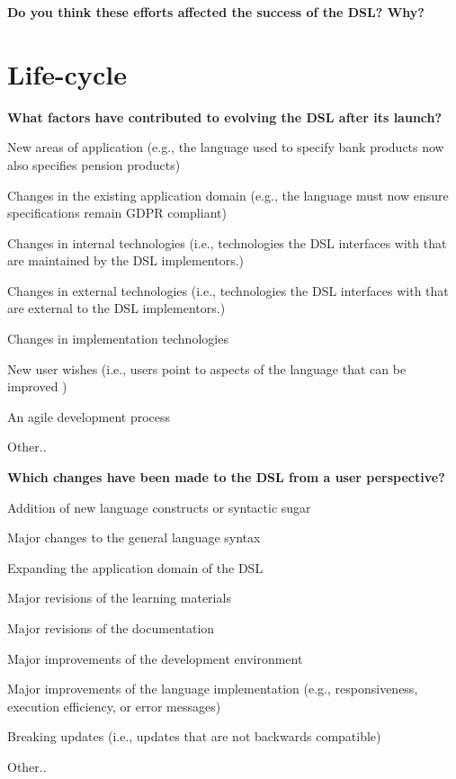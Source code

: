 \documentclass{article}
\begin{document}
\textbf{Do you think these efforts affected the success of the DSL? Why?}\\
\fbox{\begin{minipage}{\textwidth}
\
\
\
\end{minipage}}
\section*{Life-cycle}

\textbf{What factors have contributed to evolving the DSL after its launch?}\\
\begin{checklist}
  \item New areas of application (e.g., the language used to specify bank products now also specifies pension products)
  \item Changes in the existing application domain (e.g., the language must now ensure specifications remain GDPR compliant)
  \item Changes in internal technologies (i.e., technologies the DSL interfaces with that are maintained by the DSL implementors.)
  \item Changes in external technologies (i.e., technologies the DSL interfaces with that are external to the DSL implementors.)
  \item Changes in implementation technologies
  \item New user wishes (i.e., users point to aspects of the language that can be improved )
  \item An agile development process
  \item Other..
\end{checklist}
\vspace{0.5cm}

\textbf{Which changes have been made to the DSL from a user perspective?}\\
\begin{checklist}
  \item Addition of new language constructs or syntactic sugar
  \item Major changes to the general language syntax
  \item Expanding the application domain of the DSL
  \item Major revisions of the learning materials
  \item Major revisions of the documentation
  \item Major improvements of the development environment
  \item Major improvements of the language implementation (e.g., responsiveness, execution efficiency, or error messages)
  \item Breaking updates (i.e., updates that are not backwards compatible)
  \item Other..
\end{checklist}
\vspace{0.5cm}
\end{document}
